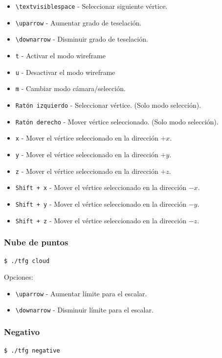 \begin{itemize}
		\item \verb|\textvisiblespace| - Seleccionar siguiente vértice.
		\item \verb|\uparrow| - Aumentar grado de teselación.
		\item \verb|\downarrow| - Disminuir grado de teselación.
		\item \verb|t| - Activar el modo wireframe
		\item \verb|u| - Desactivar el modo wireframe
		\item \verb|m| - Cambiar modo cámara/selección.
		\item \verb|Ratón izquierdo| - Seleccionar vértice. (Solo modo
				selección).
		\item \verb|Ratón derecho| - Mover vértice seleccionado. (Solo modo
				selección).
		\item \verb|x| - Mover el vértice seleccionado en la dirección $+x$.
		\item \verb|y| - Mover el vértice seleccionado en la dirección $+y$.
		\item \verb|z| - Mover el vértice seleccionado en la dirección $+z$.
		\item \verb|Shift + x| - Mover el vértice seleccionado en la dirección $-x$.
		\item \verb|Shift + y| - Mover el vértice seleccionado en la dirección $-y$.
		\item \verb|Shift + z| - Mover el vértice seleccionado en la dirección $-z$.
\end{itemize}

\subsubsection{Nube de puntos}

\verb|$ ./tfg cloud|

Opciones:

\begin{itemize}
		\item \verb|\uparrow| - Aumentar límite para el escalar.
		\item \verb|\downarrow| - Disminuir límite para el escalar.
\end{itemize}

\subsubsection{Negativo}

\verb|$ ./tfg negative|

